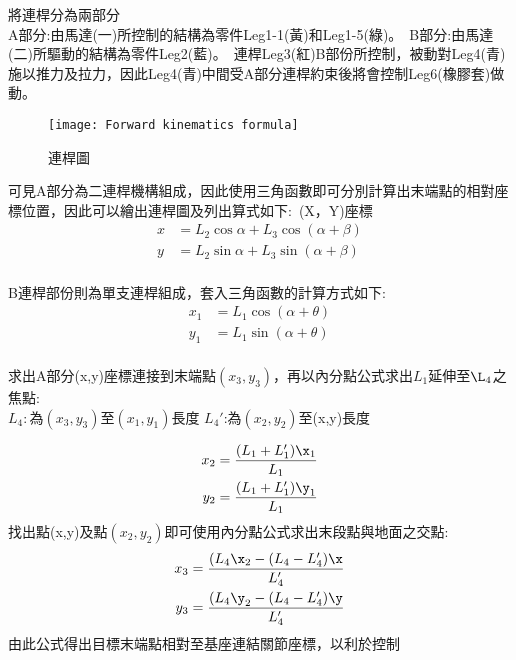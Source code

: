 將連桿分為兩部分\\
A部分:由馬達(一)所控制的結構為零件Leg1-1(黃)和Leg1-5(綠)。\
B部分:由馬達(二)所驅動的結構為零件Leg2(藍)。\
連桿Leg3(紅)B部份所控制，被動對Leg4(青)施以推力及拉力，因此Leg4(青)中間受A部分連桿約束後將會控制Leg6(橡膠套)做動。\\


\begin{figure}[hbt!]
\begin{center}
\texttt{[image: Forward kinematics formula]}
\caption{\Large 連桿圖}\label{Forward kinematics formula}
\end{center}
\end{figure}

可見A部分為二連桿機構組成，因此使用三角函數即可分別計算出末端點的相對座標位置，因此可以繪出連桿圖及列出算式如下:\
(X，Y)座標
\[
\begin{aligned}
x&=L_{2}\cos \alpha +L_{3}\cos \left( \alpha +\beta \right)\\
y&=L_{2}\sin \alpha +L_{3}\sin \left( \alpha +\beta \right)\\
\end{aligned}
\]

B連桿部份則為單支連桿組成，套入三角函數的計算方式如下:\\
\[
\begin{aligned}
x_{1}&=L_{1}\cos \left( \alpha +\theta \right)\\
y_{1}&=L_{1}\sin \left( \alpha +\theta \right)\\
\end{aligned}
\]

求出A部分(x,y)座標連接到末端點$(x_3,y_3)$，再以內分點公式求出$L_1$延伸至$\L_4$之焦點:\\
$L_4:為(x_3,y_3)至(x_1,y_1)長度$
$L_4'$:為$(x_2,y_2)$至(x,y)長度

\[
\begin{align*}
x_{2}&= \frac{(L_{1} + L_{1}') \x_{1}}{L_{1}} \\
y_{2}&= \frac{(L_{1} + L_{1}') \y_{1}}{L_{1}}
\end{align*}
\]
找出點(x,y)及點$(x_2,y_2)$即可使用內分點公式求出末段點與地面之交點:\\
\[
\begin{align*}
x_{3}&= \frac{(L_{4} \x_{2} - (L_{4} - L_{4}') \x}{L_{4}'} \\
y_{3}&= \frac{(L_{4} \y_{2} - (L_{4} - L_{4}') \y}{L_{4}'}
\end{align*}
\]
由此公式得出目標末端點相對至基座連結關節座標，以利於控制\\

